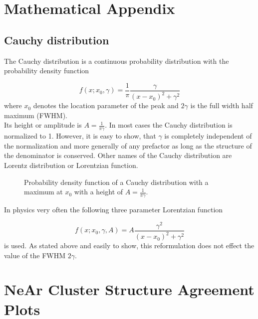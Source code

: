 \begin{appendix}

\chapter{Mathematical Appendix}
\section{Cauchy distribution} \label{section:app_cauchy}
The Cauchy distribution is a continuous probability distribution
with the probability density function

\begin{equation}
  f(x;x_0,\gamma) = \frac 1\pi \frac{\gamma}{(x-x_0)^2 + \gamma^2}
\end{equation}
where $x_0$ denotes the location parameter of the peak and
$2 \gamma$ is the full width half maximum (FWHM).\\
Its height or amplitude is $A = \frac{1}{\pi\gamma}$.
In most cases the
Cauchy distribution is normalized to 1. However, it is easy to show,
that $\gamma$ is completely
independent of the normalization and more generally of any prefactor
as long as the structure of the denominator is conserved.
Other names of the Cauchy distribution are Lorentz distribution or
Lorentzian function.


\begin{figure}[h]
  \centering
  
  \caption{Probability density function of a Cauchy distribution with a
           maximum at $x_0$ with a height of $A=\frac{1}{\pi\gamma}$.}
  \label{figure:cauchy_distribution}
\end{figure}


In physics very often the following three parameter Lorentzian function

\begin{equation}
  f(x;x_0,\gamma,A) = A \frac{\gamma^2}{(x-x_0)^2 + \gamma^2}
\end{equation}
is used. As stated above and easily to show, this reformulation does
not effect the value of the FWHM $2 \gamma$.


\chapter{NeAr Cluster Structure Agreement Plots}




\end{appendix}
